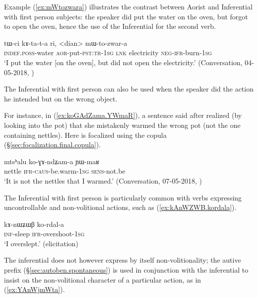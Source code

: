 Example (\ref{ex:mWtozwara}) illustrates the contrast between Aorist and Inferential with first person subjects: the speaker did put the water on the oven, but forgot to open the oven, hence the use of the Inferential for the second verb.

\largerpage
\begin{exe}
\ex \label{ex:mWtozwara}
\gll tɯ-ci kɤ-ta-t-a ri, <dian> mɯ-to-zwar-a \\
\textsc{indef}.\textsc{poss}-water \textsc{aor}-put-\textsc{pst}:\textsc{tr}-\textsc{1sg} \textsc{lnk} electricity \textsc{neg}-\textsc{ifr}-burn-\textsc{1sg} \\
\glt `I put the water [on the oven], but did not open the electricity.' (Conversation, 04-05-2018, )
\end{exe}

The Inferential with first person can also be used when the speaker did the action he intended but on the wrong object. 

For instance, in (\ref{ex:koGAdZama.YWmaR}), a sentence said after  realized (by looking into the pot) that she mistakenly warmed the wrong pot (not the one containing nettles). Here  is focalized using the copula  (§\ref{sec:focalization.final.copula}).

\begin{exe}
\ex \label{ex:koGAdZama.YWmaR}
\gll  mtsʰalu ko-ɣɤ-ndʑam-a ɲɯ-maʁ \\
nettle \textsc{ifr}-\textsc{caus}-be.warm-\textsc{1sg} \textsc{sens}-not.be \\
\glt `It is not the nettles that I warmed.' (Conversation, 07-05-2018, )
\end{exe}


The Inferential with first person is particularly common with verbs expressing uncontrollable and non-volitional actions, such as (\ref{ex:kAnWZWB.kordala}). 

\begin{exe}
\ex \label{ex:kAnWZWB.kordala}
\gll kɤ-nɯʑɯβ ko-rdal-a \\
\textsc{inf}-sleep \textsc{ifr}-overshoot-\textsc{1sg} \\
\glt `I overslept.' (elicitation)
\end{exe}

The inferential does not however express by itself non-volitionality; the autive prefix  (§\ref{sec:autoben.spontaneous}) is used in conjunction with the inferential to insist on the non-volitional character of a particular action, as in (\ref{ex:YAnWjmWta}).

